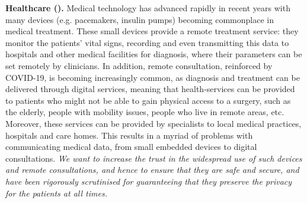 \begin{Workpackage}{\thewpno}
\begin{Task}

\textbf{Healthcare (\SOPRAshort{}).} 
Medical technology has advanced rapidly in recent years 
with many devices (e.g. pacemakers, insulin pumps) becoming commonplace in medical treatment. These small devices  provide a remote treatment service: they monitor the patients' vital signs, recording and even transmitting this data to hospitals and other medical facilities for diagnosis, where their parameters can be set remotely by clinicians.
In addition, remote consultation, reinforced by  COVID-19, is becoming increasingly common, as diagnosis and treatment can be delivered through digital services, meaning that health-services can be provided to patients who might not be able to gain physical access to a surgery, such as the elderly, people with mobility issues, people who live in remote areas, etc. Moreover, these services can be provided by specialists to local medical practices, hospitals and care homes. This results in a myriad of problems with communicating medical data, from small embedded devices to digital consultations. 
\emph{We want to increase the trust in the widespread use of such devices and remote consultations, and hence
to ensure that they are safe and secure, and have been rigorously scrutinised for guaranteeing that they preserve 
the privacy for the patients at all times.}



\end{Task}
\end{Workpackage}
